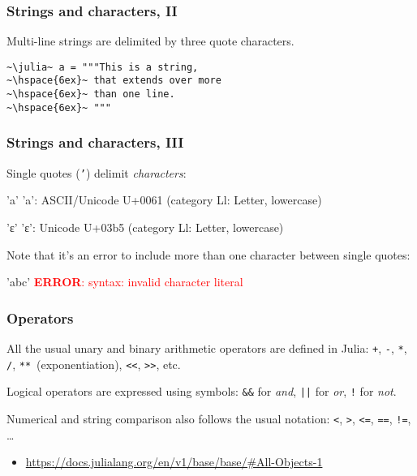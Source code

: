 \documentclass[english,serif,mathserif,xcolor=pdftex,dvipsnames,table]{beamer}
\begin{document}
\begin{frame}[fragile]
  \frametitle{Strings and characters, II}
  Multi-line strings are delimited by three quote characters.
\begin{lstlisting}[showstringspaces=false]
~\julia~ a = """This is a string,
~\hspace{6ex}~ that extends over more
~\hspace{6ex}~ than one line.
~\hspace{6ex}~ """
\end{lstlisting}
\end{frame}


\begin{frame}
  \frametitle{Strings and characters, III}
  Single quotes (\texttt{'}) delimit \emph{characters}:
\begin{semiverbatim}\smaller
\julia 'a'
'a': ASCII/Unicode U+0061 (category Ll: Letter, lowercase)

\julia 'ε'
'ε': Unicode U+03b5 (category Ll: Letter, lowercase)
\end{semiverbatim}

  \+ Note that it's an error to include more than one character
  between single quotes:
\begin{semiverbatim}
\julia 'abc'
\textcolor{red}{\textbf{ERROR}: syntax: invalid character literal}
\end{semiverbatim}
\end{frame}


\begin{frame}[fragile]
  \frametitle{Operators}
  All the usual unary and binary arithmetic operators are
  defined in Julia: \texttt{+}, \texttt{-}, \texttt{*}, \texttt{/},
  \texttt{**}~(exponentiation), \texttt{<{}<}, \texttt{>{}>}, etc.

  \+ Logical operators are expressed using symbols:
  \lstinline|&&| for \emph{and},
  \lstinline:||: for \emph{or},
  \lstinline|!| for \emph{not}.

  \+
  Numerical and string comparison also follows the usual notation:
  \texttt{<}, \texttt{>}, \texttt{<=}, \texttt{==}, \texttt{!=},
  \ldots

  \+
  \begin{references}
    \tiny
    \begin{itemize}
    \item \url{https://docs.julialang.org/en/v1/base/base/#All-Objects-1}
    \end{itemize}
  \end{references}
\end{frame}
\end{document}
